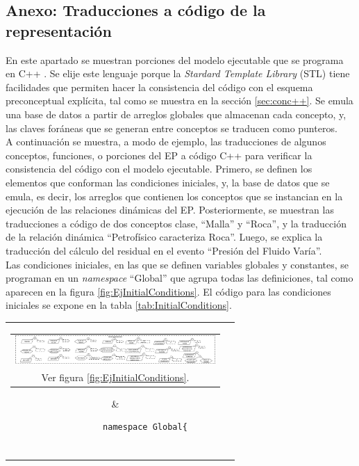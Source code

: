 \begin{appendix}
\chapter{Anexo: Traducciones a código de la representación}
En este apartado se muestran porciones del modelo ejecutable que se programa en C++ \citep{ISO:2017:IIIa}. Se elije este lenguaje porque la \textit{Stardard Template Library} (STL) tiene facilidades que permiten hacer la consistencia del código con el esquema preconceptual explícita, tal como se muestra en la sección \ref{sec:conc++}. Se emula una base de datos a partir de arreglos globales que almacenan cada concepto, y, las claves foráneas que se generan entre conceptos se traducen como punteros. \\

A continuación se muestra, a modo de ejemplo, las traducciones de algunos conceptos, funciones, o porciones del EP a código C++ para verificar la consistencia del código con el modelo ejecutable. Primero, se definen los elementos que conforman las condiciones iniciales, y, la base de datos que se emula, es decir, los arreglos que contienen los conceptos que se instancian en la ejecución de las relaciones dinámicas del EP. Posteriormente, se muestran las traducciones a código de dos conceptos clase, ``Malla'' y ``Roca'', y la traducción de la relación dinámica ``Petrofísico caracteriza Roca''. Luego, se explica la traducción del cálculo del residual en el evento ``Presión del Fluido Varía''.\\

Las condiciones iniciales, en las que se definen variables globales y constantes, se programan en un \textit{namespace} ``Global'' que agrupa todas las definiciones, tal como aparecen en la figura \ref{fig:EjInitialConditions}. El código para las condiciones iniciales se expone en la tabla \ref{tab:InitialConditions}.\\

\begin{table}[h]
	\centering
	\begin{tabular}{cc}
		\parbox[c]{10em}{
			\begin{tabular}[c]{@{}c@{}}\includegraphics[width=3in]{Fig/EjInitialConditions.pdf}\\ Ver figura \ref{fig:EjInitialConditions}.\end{tabular}
		}
		&
		\begin{tiny}
			\begin{lstlisting}
			namespace Global{
			

\end{lstlisting}
\end{tiny}
\end{tabular}
\end{table}
\end{appendix}
